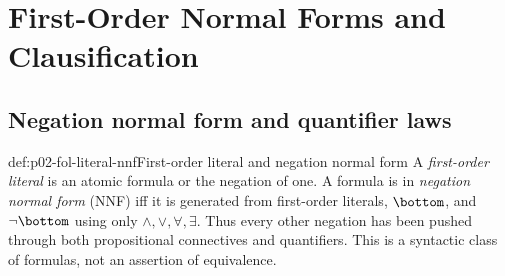 
\chapter{First-Order Normal Forms and Clausification}
\label{sec:p02-first-order-normal-forms}

\section{Negation normal form and quantifier laws}
\label{sec:p02-fol-nnf}

\begin{hbdefinition}{def:p02-fol-literal-nnf}{First-order literal and negation normal form}
A \emph{first-order literal} is an atomic formula
or the negation of one.  A formula is in \emph{negation normal form}
(NNF) iff it is generated from
first-order literals, \(\bottom\), and \(\neg\bottom\) using only
\(\land,\lor,\forall,\exists\).  Thus every other negation has been pushed
through both propositional connectives and quantifiers.  This is a syntactic
class of formulas, not an assertion of equivalence.
\end{hbdefinition}

